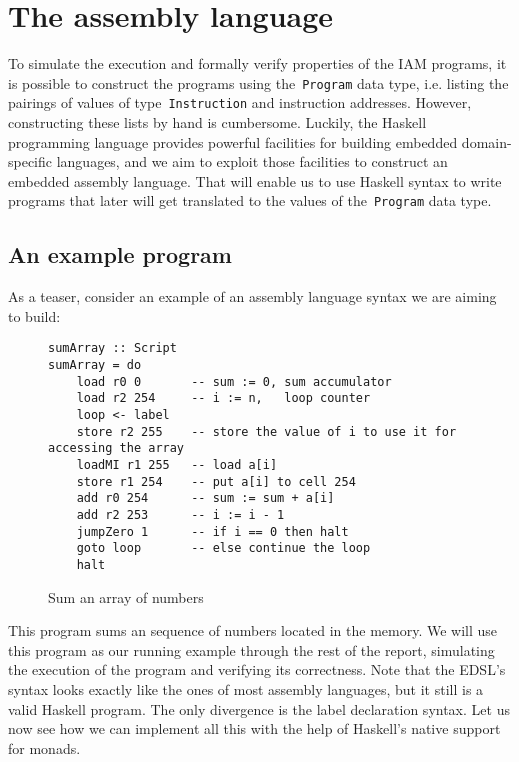 
\section{The assembly language}

To simulate the execution and formally verify properties of the IAM programs,
it is possible to construct the programs using the~\texttt{Program} data type, i.e.
listing the pairings of values of type~\texttt{Instruction} and instruction addresses.
However, constructing these lists by hand is cumbersome. Luckily, the Haskell programming
language provides powerful facilities for building embedded domain-specific languages, and
we aim to exploit those facilities to construct an embedded assembly language.
That will enable us to use Haskell syntax to write programs that later will get translated
to the values of the~\texttt{Program} data type.

\subsection{An example program}

As a teaser, consider an example of an assembly language syntax we are aiming to build:

\begin{figure}[H]
\begin{verbatim}
sumArray :: Script
sumArray = do
    load r0 0       -- sum := 0, sum accumulator
    load r2 254     -- i := n,   loop counter
    loop <- label
    store r2 255    -- store the value of i to use it for accessing the array
    loadMI r1 255   -- load a[i]
    store r1 254    -- put a[i] to cell 254
    add r0 254      -- sum := sum + a[i]
    add r2 253      -- i := i - 1
    jumpZero 1      -- if i == 0 then halt
    goto loop       -- else continue the loop
    halt
\end{verbatim}
\caption{Sum an array of numbers}
\label{syntaxExample}
\end{figure}

This program sums an sequence of numbers located in the memory. We will use this program as
our running example through the rest of the report, simulating the execution of the program
and verifying its correctness. Note that the EDSL's syntax looks exactly like the ones of most
assembly languages, but it still is a valid Haskell program. The only
divergence is the label declaration syntax. Let us now see how we can implement
all this with the help of Haskell's native support for monads.

